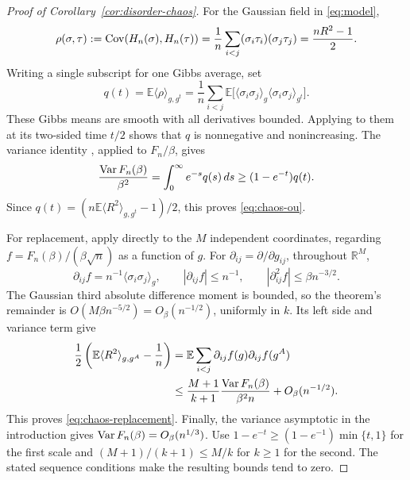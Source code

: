 \begin{proof}[Proof of Corollary~\ref{cor:disorder-chaos}]
For the Gaussian field in \eqref{eq:model},
\[
 \rho(\sigma,\tau):=\operatorname{Cov}(H_n(\sigma),H_n(\tau))
 =\frac1n\sum_{i<j}(\sigma_i\tau_i)(\sigma_j\tau_j)
 =\frac{nR^2-1}{2}.
\]
Writing a single subscript for one Gibbs average, set
\[
 q(t)=\mathbb E\langle\rho\rangle_{g,g^t}
 =\frac1n\sum_{i<j}
 \mathbb E\big[\langle\sigma_i\sigma_j\rangle_g
               \langle\sigma_i\sigma_j\rangle_{g^t}\big].
\]
These Gibbs means are smooth with all derivatives bounded. Applying
\cite[Lemma~3.3]{Chatterjee2009} to them at its two-sided time $t/2$
shows that $q$ is nonnegative and nonincreasing. The variance identity
\cite[Theorem~3.8]{Chatterjee2009}, applied to $F_n/\beta$, gives
\[
 \frac{\operatorname{Var} F_n(\beta)}{\beta^2}
 =\int_0^\infty e^{-s}q(s)\,ds
 \ge (1-e^{-t})q(t).
\]
Since $q(t)=(n\mathbb E\langle R^2\rangle_{g,g^t}-1)/2$, this proves
\eqref{eq:chaos-ou}.

For replacement, apply \cite[Theorem~3.14]{Chatterjee2009} directly to
the $M$ independent coordinates, regarding
$f=F_n(\beta)/(\beta\sqrt n)$ as a function of $g$. For
$\partial_{ij}=\partial/\partial g_{ij}$, throughout $\mathbb R^M$,
\[
 \partial_{ij}f=n^{-1}\langle\sigma_i\sigma_j\rangle_g,\qquad
 |\partial_{ij}f|\le n^{-1},\qquad
 |\partial_{ij}^2f|\le\beta n^{-3/2}.
\]
The Gaussian third absolute difference moment is bounded, so the
theorem's remainder is $O(M\beta n^{-5/2})=O_\beta(n^{-1/2})$,
uniformly in $k$. Its left side and variance term give
\[
 \begin{aligned}
 \frac12\left(\mathbb E\langle R^2\rangle_{g,g^A}-\frac1n\right)
 &=\mathbb E\sum_{i<j}\partial_{ij}f(g)\partial_{ij}f(g^A)\\
 &\le\frac{M+1}{k+1}\frac{\operatorname{Var} F_n(\beta)}{\beta^2n}
       +O_\beta(n^{-1/2}).
 \end{aligned}
\]
This proves \eqref{eq:chaos-replacement}. Finally, the variance
asymptotic in the introduction gives $\operatorname{Var} F_n(\beta)=O_\beta(n^{1/3})$.
Use $1-e^{-t}\ge(1-e^{-1})\min\{t,1\}$ for the first scale and
$(M+1)/(k+1)\le M/k$ for $k\ge1$ for the second. The stated sequence
conditions make the resulting bounds tend to zero.
\end{proof}
